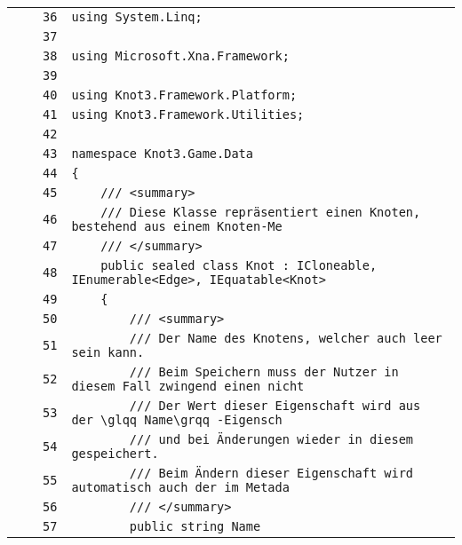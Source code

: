 \documentclass[a4paper,10pt]{article}
\begin{document}
\begin{longtable}[l]{lrrl}
\cellcolor{gray} &  & \verb~36~ & \verb~using System.Linq;~\\
\cellcolor{gray} &  & \verb~37~ & \verb~~\\
\cellcolor{gray} &  & \verb~38~ & \verb~using Microsoft.Xna.Framework;~\\
\cellcolor{gray} &  & \verb~39~ & \verb~~\\
\cellcolor{gray} &  & \verb~40~ & \verb~using Knot3.Framework.Platform;~\\
\cellcolor{gray} &  & \verb~41~ & \verb~using Knot3.Framework.Utilities;~\\
\cellcolor{gray} &  & \verb~42~ & \verb~~\\
\cellcolor{gray} &  & \verb~43~ & \verb~namespace Knot3.Game.Data~\\
\cellcolor{gray} &  & \verb~44~ & \verb~{~\\
\cellcolor{gray} &  & \verb~45~ & \verb~    /// <summary>~\\
\cellcolor{gray} &  & \verb~46~ & \verb~    /// Diese Klasse repräsentiert einen Knoten, bestehend aus einem Knoten-Me~\\
\cellcolor{gray} &  & \verb~47~ & \verb~    /// </summary>~\\
\cellcolor{gray} &  & \verb~48~ & \verb~    public sealed class Knot : ICloneable, IEnumerable<Edge>, IEquatable<Knot>~\\
\cellcolor{gray} &  & \verb~49~ & \verb~    {~\\
\cellcolor{gray} &  & \verb~50~ & \verb~        /// <summary>~\\
\cellcolor{gray} &  & \verb~51~ & \verb~        /// Der Name des Knotens, welcher auch leer sein kann.~\\
\cellcolor{gray} &  & \verb~52~ & \verb~        /// Beim Speichern muss der Nutzer in diesem Fall zwingend einen nicht~\\
\cellcolor{gray} &  & \verb~53~ & \verb~        /// Der Wert dieser Eigenschaft wird aus der \glqq Name\grqq -Eigensch~\\
\cellcolor{gray} &  & \verb~54~ & \verb~        /// und bei Änderungen wieder in diesem gespeichert.~\\
\cellcolor{gray} &  & \verb~55~ & \verb~        /// Beim Ändern dieser Eigenschaft wird automatisch auch der im Metada~\\
\cellcolor{gray} &  & \verb~56~ & \verb~        /// </summary>~\\
\cellcolor{gray} &  & \verb~57~ & \verb~        public string Name~\\

\end{longtable}
\end{document}
